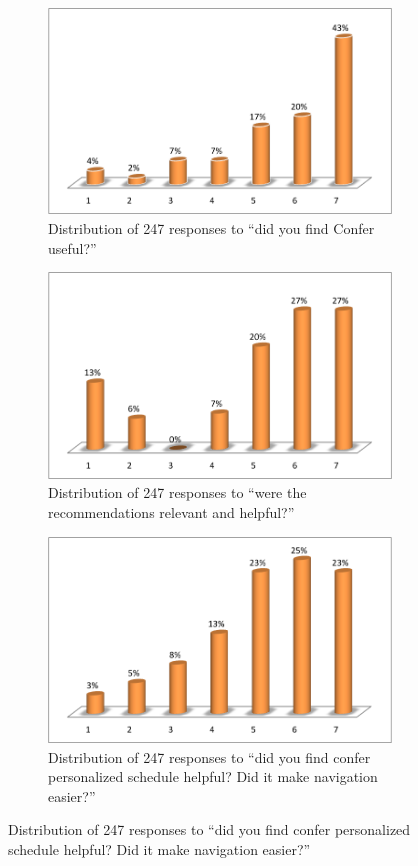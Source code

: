 \documentclass{sigchi}
\begin{document}
\begin{figure}[!h]
\centering

\begin{subfigure}[t]{0.9\columnwidth}
\centering
\includegraphics[width=0.9\columnwidth]{survey-q-1.png}
\caption{Distribution of 247 responses to ``did you find Confer useful?''}
\label{survey-q-1}
\end{subfigure}

\vspace{10pt}
\begin{subfigure}[t]{0.9\columnwidth}
\centering
\includegraphics[width=0.9\columnwidth]{survey-q-2.png}
\caption{Distribution of 247 responses to ``were the recommendations relevant and helpful?''}
\label{survey-q-2}
\end{subfigure}

\vspace{10pt}
\begin{subfigure}[t]{.9\columnwidth}
\centering
\includegraphics[width=0.9\columnwidth]{survey-q-4.png}
\caption{Distribution of 247 responses to ``did you find confer personalized schedule helpful? Did it make navigation easier?''}
\label{survey-q-4}
\end{subfigure}


\end{figure}
\end{document}
